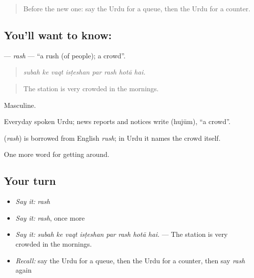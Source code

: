 \begin{quote}
Before the new one: say the Urdu for a queue, then the Urdu for a counter.
\end{quote}

\subsection*{You'll want to know: }
\textbf{} — \emph{rash} — \textquotedblleft{}a rush (of people); a crowd\textquotedblright{}.

\begin{quote}
       
\end{quote}

\begin{quote}
\emph{subah ke vaqt isṭeshan par rash hotā hai.}
\end{quote}

\begin{quote}
The station is very crowded in the mornings.
\end{quote}

Masculine.

Everyday spoken Urdu; news reports and notices write  (hujūm), \textquotedblleft{}a crowd\textquotedblright{}.

\begin{cousinweb}
\textbf{} (\emph{rash}) is borrowed from English \emph{rush}; in Urdu it names the crowd itself.
\end{cousinweb}

\begin{grammarlens}[title={What you've built}]
One more word for getting around.
\end{grammarlens}

\subsection*{Your turn}
\begin{itemize}
\raggedright
  \item \emph{Say it:} \emph{rash}
  \item \emph{Say it:} \emph{rash}, once more
  \item \emph{Say it:} \emph{subah ke vaqt isṭeshan par rash hotā hai.} — The station is very crowded in the mornings.
  \item \emph{Recall:} say the Urdu for a queue, then the Urdu for a counter, then say \emph{rash} again
\end{itemize}

